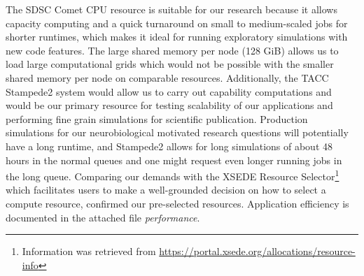 The SDSC Comet CPU resource is suitable for our research because it allows
capacity computing and a quick turnaround on small to medium-scaled jobs
for shorter runtimes, which makes it ideal for running exploratory simulations 
with new code features. The large shared memory per node (128 GiB) allows us to load 
large computational grids which would not be possible with the smaller shared memory
per node on comparable resources. Additionally, the TACC Stampede2 system would 
allow us to carry out capability computations and would
be our primary resource for testing scalability of our applications and performing 
fine grain simulations for scientific publication. Production simulations for
 our neurobiological motivated research questions will potentially have a long 
runtime, and Stampede2 allows for long simulations of about 48 hours in the normal 
queues and one might request even longer running jobs in the long queue.
Comparing our demands with the XSEDE Resource Selector\footnote{Information was 
retrieved from \url{https://portal.xsede.org/allocations/resource-info}}
which facilitates users to make a well-grounded decision on how to select a 
compute resource, confirmed our pre-selected resources. Application efficiency 
is documented in the attached file \textit{performance}.
